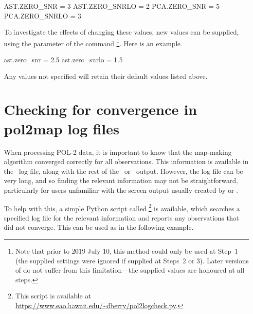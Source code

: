 \begin{terminalv}
AST.ZERO_SNR = 3 
AST.ZERO_SNRLO = 2 
PCA.ZERO_SNR = 5 
PCA.ZERO_SNRLO = 3
\end{terminalv}

To investigate the effects of changing these values, new values can be supplied, using the
 parameter of the  command \footnote{Note that prior
to 2019 July 10, this method could only be used at Step~1 (the supplied settings were ignored
if supplied at Steps~2 or 3). Later versions of  do not suffer from this
limitation---the supplied values are honoured at all steps.}.  Here is an
example.

\begin{terminalv}
ast.zero_snr = 2.5
ast.zero_snrlo = 1.5
\end{terminalv}

Any values not specified will retain their default values listed above.


\section{Checking for convergence in pol2map log files}

When processing POL-2 data, it is important to know that the map-making algorithm converged
correctly for all observations. This information is available in the \poltwomap\ log file, along with
the rest of the \makemap\ or \skyloop\ output.  However, the log file can be very long, and
so finding the relevant information may not be straightforward, particularly for users unfamiliar
with the screen output usually created by  or .

To help with this, a simple Python script called
\footnote{This script is available at
\url{https://www.eao.hawaii.edu/~dberry/pol2logcheck.py}.} is available, which
searches a specified  log file for the relevant information and
reports any observations that did not converge. This can be used as in the
following example.



